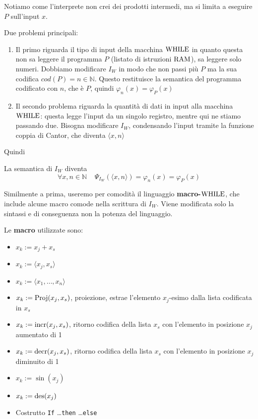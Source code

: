 \begin{center}
	
\end{center}

Notiamo come l'interprete non crei dei prodotti intermedi, ma si limita a eseguire $P$ sull'input $x$.

Due problemi principali: 
\begin{enumerate}
	\item Il primo riguarda il tipo di input della macchina $\text{WHILE}$ in quanto questa non sa leggere il programma $P$ (listato di istruzioni $\text{RAM}$), sa leggere solo numeri. Dobbiamo modificare $I_W$ in modo che non passi più $P$ ma la sua codifica $cod(P) = n \in \mathbb{N}$. Questo restituisce la semantica del programma codificato con $n$, che è $P$, quindi $\varphi_n (x) = \varphi_P (x)$
	\item Il secondo problema riguarda la quantità di dati in input alla macchina $\text{WHILE}$: questa legge l'input da un singolo registro, mentre qui ne stiamo passando due. Bisogna modificare $I_W$, condensando l'input tramite la funzione coppia di Cantor, che diventa $\langle x,n \rangle$
\end{enumerate}
Quindi
\begin{center}
	
\end{center}

La semantica di $I_W$ diventa
$$ \forall x,n \in \mathbb{N} \;\;\;\; \Psi_{I_W} \left(\langle x,n \rangle \right) = \varphi_n (x) = \varphi_P (x) $$

Similmente a prima, useremo per comodità il linguaggio \textbf{macro-$\text{WHILE}$}, che include alcune macro comode nella scrittura di $I_W$. Viene modificata solo la sintassi e di conseguenza non la potenza del linguaggio.

Le \textbf{macro} utilizzate sono: 
\begin{itemize}
	\item $x_k := x_j + x_s$
	\item $x_k := \langle x_j, x_s \rangle$
	\item $x_k := \langle x_1, \dots, x_n \rangle$
	\item $x_k := \text{Proj}(x_j, x_s)$, proiezione, estrae l'elemento $x_j$-esimo dalla lista codificata in $x_s$
	\item $x_k := \text{incr} (x_j, x_s)$, ritorno codifica della lista $x_s$ con l'elemento in posizione $x_j$ aumentato di 1
	\item $x_k := \text{decr}(x_j, x_s)$, ritorno codifica della lista $x_s$ con l'elemento in posizione $x_j$ diminuito di 1
	\item $x_k := \sin (x_j)$
	\item $x_k := \operatorname{des} (x_j)$
	\item Costrutto \texttt{If} \dots \texttt{then} \dots \texttt{else}
\end{itemize}

